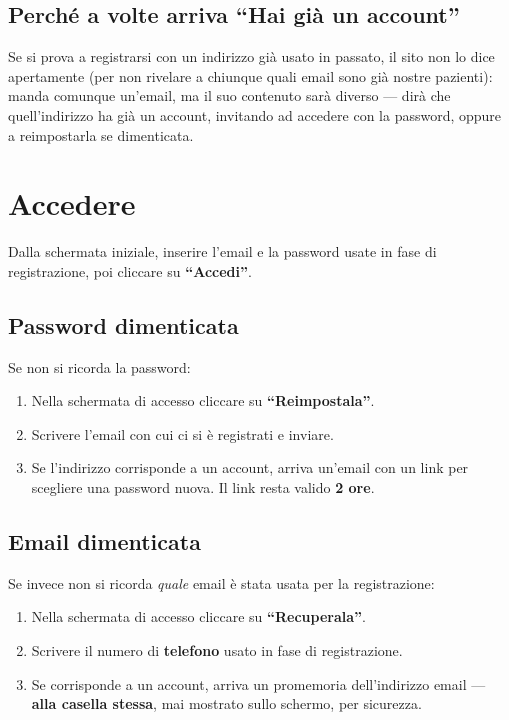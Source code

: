 \documentclass[11pt,a4paper]{article}
\newcommand{\bottone}[1]{\textbf{``#1''}}
\begin{document}
\subsection*{Perché a volte arriva ``Hai già un account''}

Se si prova a registrarsi con un indirizzo già usato in passato, il sito non lo dice apertamente (per non rivelare a chiunque quali email sono già nostre pazienti): manda comunque un'email, ma il suo contenuto sarà diverso — dirà che quell'indirizzo ha già un account, invitando ad accedere con la password, oppure a reimpostarla se dimenticata.

\section{Accedere}

Dalla schermata iniziale, inserire l'email e la password usate in fase di registrazione, poi cliccare su \bottone{Accedi}.

\subsection{Password dimenticata}

Se non si ricorda la password:
\begin{enumerate}
  \item Nella schermata di accesso cliccare su \bottone{Reimpostala}.
  \item Scrivere l'email con cui ci si è registrati e inviare.
  \item Se l'indirizzo corrisponde a un account, arriva un'email con un link per scegliere una password nuova. Il link resta valido \textbf{2 ore}.
\end{enumerate}

\subsection{Email dimenticata}

Se invece non si ricorda \emph{quale} email è stata usata per la registrazione:
\begin{enumerate}
  \item Nella schermata di accesso cliccare su \bottone{Recuperala}.
  \item Scrivere il numero di \textbf{telefono} usato in fase di registrazione.
  \item Se corrisponde a un account, arriva un promemoria dell'indirizzo email — \textbf{alla casella stessa}, mai mostrato sullo schermo, per sicurezza.
\end{enumerate}
\end{document}
